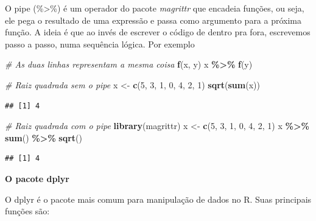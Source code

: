 \documentclass[
]{book}
\newenvironment{Shaded}{\begin{snugshade}}{\end{snugshade}}
\newcommand{\CommentTok}[1]{\textcolor[rgb]{0.56,0.35,0.01}{\textit{#1}}}
\newcommand{\DecValTok}[1]{\textcolor[rgb]{0.00,0.00,0.81}{#1}}
\newcommand{\FunctionTok}[1]{\textcolor[rgb]{0.13,0.29,0.53}{\textbf{#1}}}
\newcommand{\NormalTok}[1]{#1}
\newcommand{\OtherTok}[1]{\textcolor[rgb]{0.56,0.35,0.01}{#1}}
\newcommand{\SpecialCharTok}[1]{\textcolor[rgb]{0.81,0.36,0.00}{\textbf{#1}}}
\begin{document}
O pipe (\%\textgreater\%) é um operador do pacote \emph{magrittr} que encadeia funções, ou seja, ele pega o resultado de uma expressão e passa como argumento para a próxima função. A ideia é que ao invés de escrever o código de dentro pra fora, escrevemos passo a passo, numa sequência lógica. Por exemplo

\begin{Shaded}
\begin{Highlighting}[]
\CommentTok{\# As duas linhas representam a mesma coisa}
\FunctionTok{f}\NormalTok{(x, y)}
\NormalTok{x }\SpecialCharTok{\%\textgreater{}\%} \FunctionTok{f}\NormalTok{(y)}
\end{Highlighting}
\end{Shaded}

\begin{Shaded}
\begin{Highlighting}[]
\CommentTok{\# Raiz quadrada sem o pipe}
\NormalTok{x }\OtherTok{\textless{}{-}} \FunctionTok{c}\NormalTok{(}\DecValTok{5}\NormalTok{, }\DecValTok{3}\NormalTok{, }\DecValTok{1}\NormalTok{, }\DecValTok{0}\NormalTok{, }\DecValTok{4}\NormalTok{, }\DecValTok{2}\NormalTok{, }\DecValTok{1}\NormalTok{)}
\FunctionTok{sqrt}\NormalTok{(}\FunctionTok{sum}\NormalTok{(x))}
\end{Highlighting}
\end{Shaded}

\begin{verbatim}
## [1] 4
\end{verbatim}

\begin{Shaded}
\begin{Highlighting}[]
\CommentTok{\# Raiz quadrada com o pipe}
\FunctionTok{library}\NormalTok{(magrittr)}
\NormalTok{x }\OtherTok{\textless{}{-}} \FunctionTok{c}\NormalTok{(}\DecValTok{5}\NormalTok{, }\DecValTok{3}\NormalTok{, }\DecValTok{1}\NormalTok{, }\DecValTok{0}\NormalTok{, }\DecValTok{4}\NormalTok{, }\DecValTok{2}\NormalTok{, }\DecValTok{1}\NormalTok{)}
\NormalTok{x }\SpecialCharTok{\%\textgreater{}\%} \FunctionTok{sum}\NormalTok{() }\SpecialCharTok{\%\textgreater{}\%} \FunctionTok{sqrt}\NormalTok{()}
\end{Highlighting}
\end{Shaded}

\begin{verbatim}
## [1] 4
\end{verbatim}

\textbf{O pacote dplyr}

O dplyr é o pacote mais comum para manipulação de dados no R. Suas principais funções são:
\end{document}
